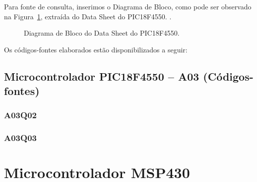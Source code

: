 \documentclass[
	12pt,				%
	openright,			%
  oneside,     %
	a4paper,			%
	english,			%
	french,				%
	spanish,			%
	brazil				%
	]{abntex2}
\begin{document}
Para fonte de consulta, inserimos o Diagrama de Bloco, como pode ser observado na Figura~\ref{fig:cha-3-diagrama-de-bloco-PIC18F4550}, extraída do Data Sheet do PIC18F4550. \cite{Inc.2009}.

\newpage

\begin{figure}[H]
  \centering
  \caption{\label{fig:cha-3-diagrama-de-bloco-PIC18F4550}Diagrama de Bloco do Data Sheet do PIC18F4550.}  
  
\end{figure}


\newpage

Os códigos-fontes elaborados estão disponibilizados a seguir:

\section*{Microcontrolador PIC18F4550 -- A03 (Códigos-fontes)}
\label{sec:PIC-A03Q02}
\subsection*{A03Q02}


\subsection*{A03Q03}











%
%


\chapter{Microcontrolador MSP430}%
\label{cha:4-MSP430}
\end{document}
